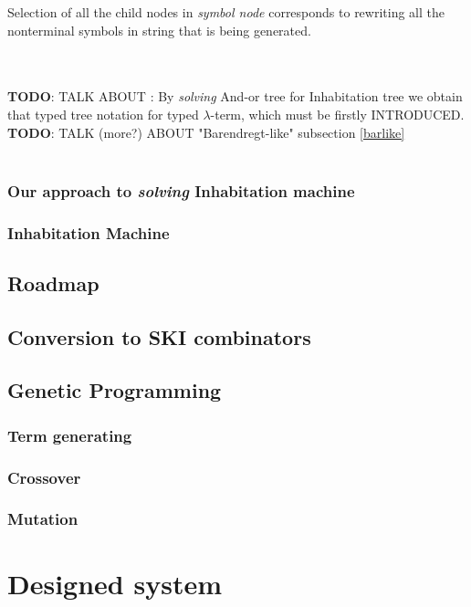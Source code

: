 \documentclass[12pt,a4paper]{report}
\begin{document}
Selection of all the child nodes in \textit{symbol node} corresponds to 
rewriting all the nonterminal symbols in string that is being generated.  



~\\\\
\textbf{TODO}: TALK ABOUT : By \textit{solving} And-or tree for Inhabitation tree
               we obtain that typed tree notation for typed $\lambda$-term,
               which must be firstly INTRODUCED.   \\
\textbf{TODO}: TALK (more?) ABOUT "Barendregt-like" subsection \ref{barlike}
\\\\ 
		

\subsection{Our approach to \textit{solving} Inhabitation machine}

\subsection{Inhabitation Machine}


\section{Roadmap}
	\section{Conversion to SKI combinators}

	\section{Genetic Programming}
		\subsection{Term generating}
		\subsection{Crossover}
		\subsection{Mutation}

\chapter{ Designed system }	
\end{document}
